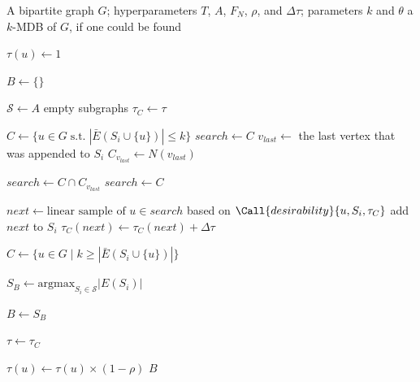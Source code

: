 \documentclass[conference]{IEEEtran}
\begin{document}
\begin{algorithm}[H]
\caption{ACO}
\label{alg:aco}
\begin{minipage}{\linewidth}
\begin{algorithmic}
   \Require A bipartite graph $G$; hyperparameters $T$, $A$, $F_N$, $\rho$, and $\Delta\tau$; parameters $k$ and $\theta$
   \Ensure a $k$-MDB of $G$, if one could be found
  
  
           \State $\tau(u) \gets 1$
       \EndFor   
  
       \State $B \gets \{\}$
  
  
           \State $\mathcal{S} \gets A$ empty subgraphs
           \State $\tau_C \gets \tau$
  
  
               \State $C \gets \{u \in G \mathrel{\text{s.t.}} |\bar{E}(S_i \cup \{u\})| \leq k\}$
                       \State $search \gets C$
                   \Else
                       \State $v_{last} \gets$ the last vertex that was appended to $S_i$
                       \State $C_{v_{last}} \gets N(v_{last})$
      
      
                           \State $search \gets C \cap C_{v_{last}}$
                       \Else
                           \State $search \gets C$
                       \EndIf
                   \EndIf
  
                   \State $next \gets \text{linear sample of } u \in search$ based on  $\Call{desirability}{u, S_i, \tau_C}$
                   \State add $next$ to $S_i$
                   \State $\tau_C(next) \gets \tau_C(next) + \Delta\tau$ 


                   \State $C \gets \{u \in G \mid k \geq |\bar{E}(S_i \cup \{u\})|\}$
               \EndWhile
           \EndForPar


           \State $S_B \gets \text{argmax}_{S_i \in \mathcal{S}}{|E(S_i)|}$ 
  
               \State $B \gets S_B$
           \EndIf
  
           \State $\tau \gets \tau_C$
  
               \State $\tau(u) \gets \tau(u) \times (1 - \rho)$
           \EndFor
       \EndFor
       \State \Return $B$
   \EndFunction
\end{algorithmic}    
\end{minipage}
\end{algorithm}
\end{document}

